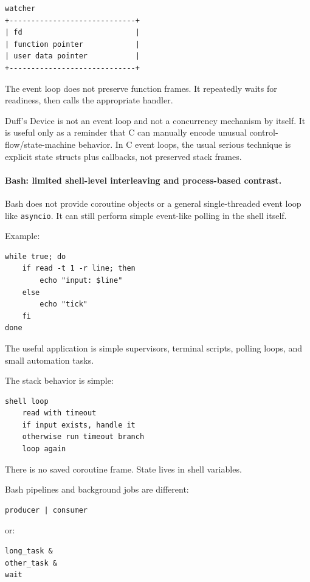 \begin{verbatim}
watcher
+-----------------------------+
| fd                          |
| function pointer            |
| user data pointer           |
+-----------------------------+
\end{verbatim}

The event loop does not preserve function frames. It repeatedly waits for readiness, then calls the appropriate handler.

Duff's Device is not an event loop and not a concurrency mechanism by itself. It is useful only as a reminder that C can manually encode unusual control-flow/state-machine behavior. In C event loops, the usual serious technique is explicit state structs plus callbacks, not preserved stack frames.

\paragraph{Bash: limited shell-level interleaving and process-based contrast.}

Bash does not provide coroutine objects or a general single-threaded event loop like \texttt{asyncio}. It can still perform simple event-like polling in the shell itself.

Example:

\begin{verbatim}
while true; do
    if read -t 1 -r line; then
        echo "input: $line"
    else
        echo "tick"
    fi
done
\end{verbatim}

The useful application is simple supervisors, terminal scripts, polling loops, and small automation tasks.

The stack behavior is simple:

\begin{verbatim}
shell loop
    read with timeout
    if input exists, handle it
    otherwise run timeout branch
    loop again
\end{verbatim}

There is no saved coroutine frame. State lives in shell variables.

Bash pipelines and background jobs are different:

\begin{verbatim}
producer | consumer
\end{verbatim}

or:

\begin{verbatim}
long_task &
other_task &
wait
\end{verbatim}

